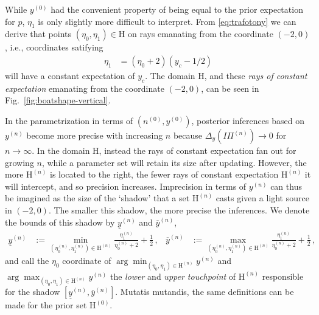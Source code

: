 \documentclass[runningheads,a4paper]{llncs}
\newcommand{\uz}{^{(0)}} %
\newcommand{\un}{^{(n)}} %
\newcommand{\ul}[1]{\underline{#1}}
\newcommand{\ol}[1]{\overline{#1}}
\def\yz{y\uz}
\def\yn{y\un}
\def\ynl{\ul{y}\un}
\def\ynu{\ol{y}\un}
\def\nz{n\uz}
\def\PN{I\!\!\Pi\un}
\def\Eta{\mathrm{H}}
\def\EZ{\mathrm{H}\uz}
\def\EN{\mathrm{H}\un}
\newcommand{\ez}{\eta_0}
\def\ezn{\eta_0\un}
\def\eon{\eta_1\un}
\begin{document}
%
While $\yz$ had the convenient property of being equal to
the prior expectation for $p$, %
$\eta_1$ is only slightly more difficult to interpret.
From \eqref{eq:trafotony} we can derive that points $(\eta_0,\eta_1) \in \Eta$
on rays emanating from the coordinate $(-2,0)$,
i.e., coordinates satifying
\begin{align}
\label{eq:raysofconstantexpectation}
\eta_1 &= (\eta_0 + 2)(y_c - 1/2) 
\end{align}
will have a constant expectation of $y_c$.
The domain $\Eta$, and these \emph{rays of constant expectation} emanating from the coordinate $(-2,0)$,
can be seen in Fig.~\ref{fig:boatshape-vertical}.

In the parametrization in terms of $(\nz,\yz)$,
posterior inferences based on $\yn$ become more precise with increasing $n$
because $\Delta_y(\PN) \to 0$ for $n \to \infty$.
In the domain $\Eta$, %
instead the rays of constant expectation fan out for growing $n$,
while a parameter set will retain its size after updating.
However, the more $\EN$ is located to the right,
the fewer rays of constant expectation $\EN$ it will intercept,
and so precision increases.
Imprecision in terms of $\yn$
can thus be imagined as the size of the `shadow' that a set $\EN$ casts
given a light source in $(-2,0)$. %
The smaller this shadow, the more precise the inferences.
We denote the bounds of this shadow by $\ynl$ and $\ynu$,
\begin{align*}
\ynl &:= \min_{(\ezn,\eon) \in \EN} \frac{\eon}{\ezn+2} + \frac{1}{2}\,, &
\ynu &:= \max_{(\ezn,\eon) \in \EN} \frac{\eon}{\ezn+2} + \frac{1}{2}\,,
\end{align*}
and call the $\ez$ coordinate of $\arg\min_{(\eta_0,\eta_1) \in \EN} \yn$ and $\arg\max_{(\eta_0,\eta_1) \in \EN} \yn$
the \emph{lower} and \emph{upper touchpoint} of $\EN$ responsible for the shadow $[\ynl, \ynu]$.
Mutatis mutandis, the same definitions can be made for the prior set $\EZ$.
\end{document}
